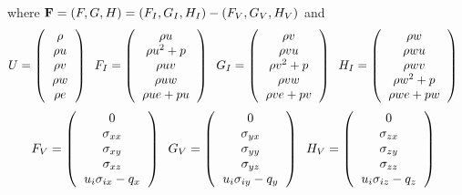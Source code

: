 where ${\bf F} = (F,G,H) = (F_I,G_I,H_I) - (F_V,G_V,H_V)$ and
\begin{equation}\label{ns}
U = \l(
\begin{tabular}{c}
$\rho$\\
$\rho u$\\
$\rho v$\\
$\rho w$\\
$\rho e$
\end{tabular}
\r) \;\; 
F_I = \l(
\begin{tabular}{c}
$\rho u$\\
$\rho u^2 + p$\\
$\rho uv$\\
$\rho uw$\\
$\rho ue + pu$
\end{tabular}
\r) \;\; 
G_I = \l(
\begin{tabular}{c}
$\rho v$\\
$\rho vu$\\
$\rho v^2 + p$\\
$\rho vw$\\
$\rho ve+pv$
\end{tabular}
\r) \;\; 
H_I = \l(
\begin{tabular}{c}
$\rho w$\\
$\rho wu$\\
$\rho wv$\\
$\rho w^2 + p$\\
$\rho we + pw$
\end{tabular}
\r) \;\; 
\end{equation}
\begin{equation}
F_V = \l(
\begin{tabular}{c}
$0$\\
$\sigma_{xx}$\\
$\sigma_{xy}$\\
$\sigma_{xz}$\\
$u_i\sigma_{ix}-q_x$
\end{tabular}
\r) \;\; 
G_V = \l(
\begin{tabular}{c}
$0$\\
$\sigma_{yx}$\\
$\sigma_{yy}$\\
$\sigma_{yz}$\\
$u_i\sigma_{iy}-q_y$
\end{tabular}
\r) \;\; 
H_V = \l(
\begin{tabular}{c}
$0$\\
$\sigma_{zx}$\\
$\sigma_{zy}$\\
$\sigma_{zz}$\\
$u_i\sigma_{iz}-q_z$
\end{tabular}
\r) \;\; 
\end{equation}

